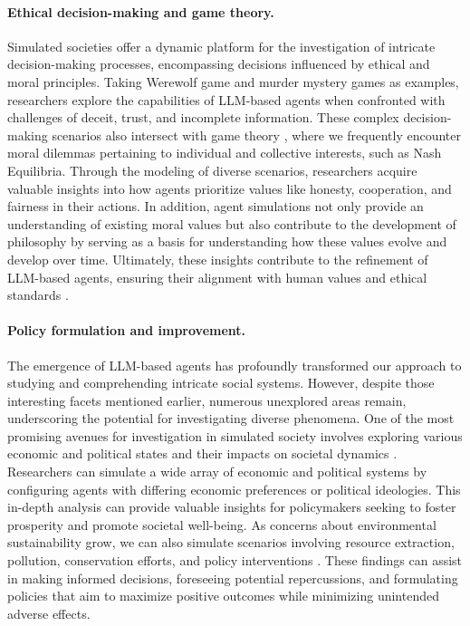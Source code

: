 \paragraph{Ethical decision-making and game theory.}
Simulated societies offer a dynamic platform for the investigation of intricate decision-making processes, encompassing decisions influenced by ethical and moral principles. 
Taking Werewolf game \cite{ xu2023exploring,DBLP:journals/corr/abs-2302-10646} and murder mystery games \cite{DBLP:journals/corr/abs-2308-07411} as examples, researchers explore the capabilities of LLM-based agents when confronted with challenges of deceit, trust, and incomplete information.
These complex decision-making scenarios also intersect with game theory \cite{DBLP:journals/corr/abs-2305-07970}, where we frequently encounter moral dilemmas pertaining to individual and collective interests, such as Nash Equilibria. 
Through the modeling of diverse scenarios, researchers acquire valuable insights into how agents prioritize values like honesty, cooperation, and fairness in their actions.
In addition, agent simulations not only provide an understanding of existing moral values but also contribute to the development of philosophy by serving as a basis for understanding how these values evolve and develop over time.
Ultimately, these insights contribute to the refinement of LLM-based agents, ensuring their alignment with human values and ethical standards \cite{DBLP:journals/corr/abs-2305-16960}.

\paragraph{Policy formulation and improvement.}
The emergence of LLM-based agents has profoundly transformed our approach to studying and comprehending intricate social systems.
However, despite those interesting facets mentioned earlier, numerous unexplored areas remain, underscoring the potential for investigating diverse phenomena.
One of the most promising avenues for investigation in simulated society involves exploring various economic and political states and their impacts on societal dynamics \cite{bellomo2013complex}.
Researchers can simulate a wide array of economic and political systems by configuring agents with differing economic preferences or political ideologies.
This in-depth analysis can provide valuable insights for policymakers seeking to foster prosperity and promote societal well-being.
As concerns about environmental sustainability grow, we can also simulate scenarios involving resource extraction, pollution, conservation efforts, and policy interventions \cite{doi:10.1080/19397038.2016.1220990}. 
These findings can assist in making informed decisions, foreseeing potential repercussions, and formulating policies that aim to maximize positive outcomes while minimizing unintended adverse effects.


